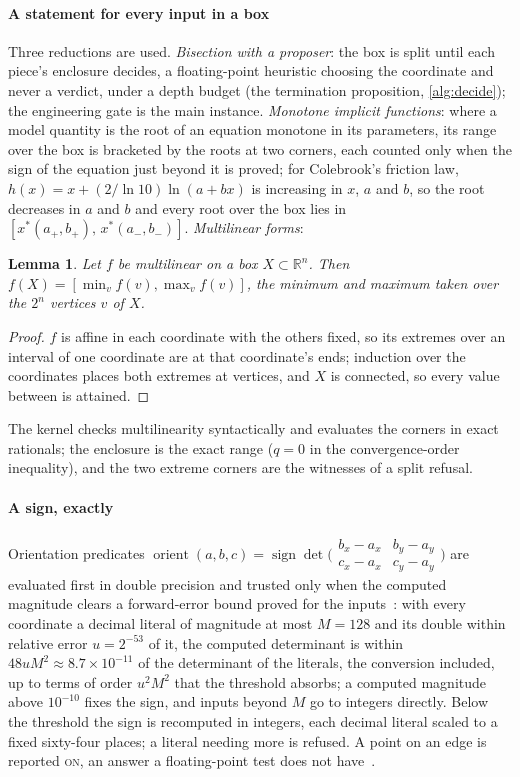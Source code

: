 \documentclass[preprint,11pt,a4paper]{elsarticle}
\newtheorem{lemma}{Lemma}
\theoremstyle{definition}
\newcommand{\R}{\mathbb{R}}
\newcommand{\verdict}[1]{{\normalfont\scshape #1}}
\begin{document}
\paragraph{A statement for every input in a box}
Three reductions are used. \emph{Bisection with a proposer}: the box is split until each piece's enclosure decides, a floating-point heuristic choosing the coordinate and never a verdict, under a depth budget (the termination proposition, \cref{alg:decide}); the engineering gate is the main instance. \emph{Monotone implicit functions}: where a model quantity is the root of an equation monotone in its parameters, its range over the box is bracketed by the roots at two corners, each counted only when the sign of the equation just beyond it is proved; for Colebrook's friction law, $h(x)=x+(2/\ln 10)\ln(a+bx)$ is increasing in $x$, $a$ and $b$, so the root decreases in $a$ and $b$ and every root over the box lies in $[x^*(a_+,b_+),\,x^*(a_-,b_-)]$. \emph{Multilinear forms}:
\begin{lemma}\label{lem:multilinear}
Let $f$ be multilinear on a box $X\subset\R^n$. Then $f(X)=[\min_v f(v),\max_v f(v)]$, the minimum and maximum taken over the $2^n$ vertices $v$ of $X$.
\end{lemma}
\begin{proof}
$f$ is affine in each coordinate with the others fixed, so its extremes over an interval of one coordinate are at that coordinate's ends; induction over the coordinates places both extremes at vertices, and $X$ is connected, so every value between is attained.
\end{proof}
The kernel checks multilinearity syntactically and evaluates the corners in exact rationals; the enclosure is the exact range ($q=0$ in the convergence-order inequality), and the two extreme corners are the witnesses of a split refusal.

\paragraph{A sign, exactly}
Orientation predicates $\operatorname{orient}(a,b,c)=\operatorname{sign}\det\bigl(\begin{smallmatrix}b_x-a_x & b_y-a_y\\ c_x-a_x & c_y-a_y\end{smallmatrix}\bigr)$ are evaluated first in double precision and trusted only when the computed magnitude clears a forward-error bound proved for the inputs~\citep[Thm.~2.2 and \S3.1]{Higham02}: with every coordinate a decimal literal of magnitude at most $M=128$ and its double within relative error $u=2^{-53}$ of it, the computed determinant is within $48uM^2\approx8.7\times10^{-11}$ of the determinant of the literals, the conversion included, up to terms of order $u^2M^2$ that the threshold absorbs; a computed magnitude above $10^{-10}$ fixes the sign, and inputs beyond $M$ go to integers directly. Below the threshold the sign is recomputed in integers, each decimal literal scaled to a fixed sixty-four places; a literal needing more is refused. A point on an edge is reported \verdict{on}, an answer a floating-point test does not have~\citep{Yap97}.
\end{document}
